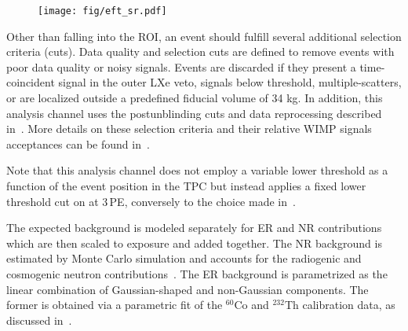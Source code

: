 \begin{figure}[]
\begin{minipage}{1\linewidth}
\centerline{\texttt{[image: fig/eft\_sr.pdf]}}
\end{minipage}
\label{fig:phasespace}
\end{figure}  


Other than falling into the ROI, an event should fulfill several additional selection criteria (cuts). Data quality and selection cuts are defined to remove events with poor data quality or noisy signals. Events are discarded if they present a time-coincident signal in the outer LXe veto, \Sii{} signals below threshold, multiple-scatters, or are localized outside a predefined fiducial volume of 34 kg. In addition, this analysis channel uses the postunblinding cuts and data reprocessing described in~\cite{xe100_run_combination}. More details on these selection criteria and their relative WIMP signals acceptances can be found in~\cite{Aprile:2012vw,xe100_run_combination}. 

Note that this analysis channel does not employ a variable lower \Si{} threshold as a function of the event position in the TPC but instead applies a fixed lower threshold cut on \cSi{} at 3\,PE, conversely to the choice made in~\cite{xe100_run_combination}.

The expected background is modeled separately for ER and NR contributions which are then scaled to exposure and added together.
The NR background is estimated by Monte Carlo simulation and accounts for the radiogenic and cosmogenic neutron
contributions~\cite{Aprile:2013tov}. The ER background is parametrized as the linear combination of Gaussian-shaped and non-Gaussian components.
The former is obtained via a parametric fit of the $^{60}$Co and $^{232}$Th calibration data, as discussed in~\cite{xe100_run10_si}.

